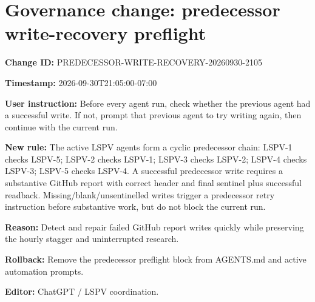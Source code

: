 \documentclass[11pt]{article}
\begin{document}
\section*{Governance change: predecessor write-recovery preflight}
\textbf{Change ID:} PREDECESSOR-WRITE-RECOVERY-20260930-2105

\textbf{Timestamp:} 2026-09-30T21:05:00-07:00

\textbf{User instruction:} Before every agent run, check whether the previous agent had a successful write. If not, prompt that previous agent to try writing again, then continue with the current run.

\textbf{New rule:} The active LSPV agents form a cyclic predecessor chain: LSPV-1 checks LSPV-5; LSPV-2 checks LSPV-1; LSPV-3 checks LSPV-2; LSPV-4 checks LSPV-3; LSPV-5 checks LSPV-4. A successful predecessor write requires a substantive GitHub report with correct header and final sentinel plus successful readback. Missing/blank/unsentinelled writes trigger a predecessor retry instruction before substantive work, but do not block the current run.

\textbf{Reason:} Detect and repair failed GitHub report writes quickly while preserving the hourly stagger and uninterrupted research.

\textbf{Rollback:} Remove the predecessor preflight block from AGENTS.md and active automation prompts.

\textbf{Editor:} ChatGPT / LSPV coordination.
\end{document}
